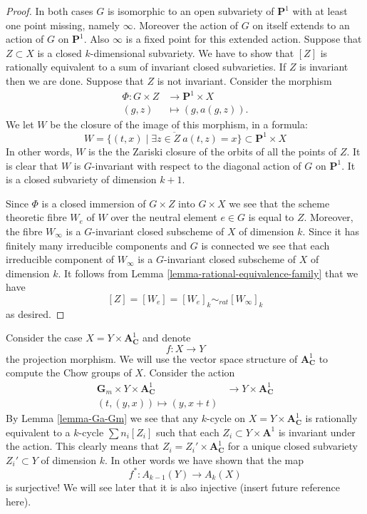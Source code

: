 \begin{proof}
In both cases $G$ is isomorphic to an open subvariety of $\mathbf{P}^1$
with at least one point missing, namely $\infty$. Moreover the
action of $G$ on itself extends to an action of $G$ on $\mathbf{P}^1$.
Also $\infty$ is a fixed point for this extended action.
Suppose that $Z \subset X$
is a closed $k$-dimensional subvariety. We have to show that $[Z]$
is rationally equivalent to a sum of invariant closed subvarieties.
If $Z$ is invariant then we are done. Suppose that $Z$ is not invariant.
Consider the morphism
\begin{align*}
\Phi : G \times Z & \longrightarrow \mathbf{P}^1 \times X \\
(g, z) & \longmapsto (g, a(g, z)).
\end{align*}
We let $W$ be the closure of the image of this morphism, in a
formula:
$$
W =
\overline{\{(t, x) \mid \exists z \in Z\ a(t, z) = x\}}
\subset \mathbf{P}^1 \times X
$$
In other words, $W$ is the
the Zariski closure of the orbits of all the points of $Z$.
It is clear that $W$ is $G$-invariant with respect to the diagonal
action of $G$ on $\mathbf{P}^1$. It is a closed subvariety of
dimension $k + 1$.

\medskip\noindent
Since $\Phi$ is a closed immersion of 
$G \times Z$ into $G \times X$ we see that the scheme theoretic
fibre $W_e$ of $W$ over the neutral element $e \in G$ is equal
to $Z$. Moreover, the fibre $W_\infty$ is a $G$-invariant closed
subscheme of $X$ of dimension $k$. Since it has finitely many
irreducible components and $G$ is connected we see that each
irreducible component of $W_\infty$ is a $G$-invariant closed
subscheme of $X$ of dimension $k$. It follows from
Lemma \ref{lemma-rational-equivalence-family}
that we have
$$
[Z] = [W_e] = [W_e]_k \sim_{rat} [W_\infty]_k
$$
as desired.
\end{proof}

\begin{example}
\label{example-affine-over-variety}
Consider the case $X = Y \times \mathbf{A}^1_{\mathbf{C}}$ and denote
$$
f : X \longrightarrow Y
$$
the projection morphism.
We will use the vector space structure of $\mathbf{A}^1_{\mathbf{C}}$
to compute the Chow groups of $X$. Consider the action
\begin{align*}
\mathbf{G}_m \times Y \times \mathbf{A}^1_{\mathbf{C}}
& \longrightarrow Y \times \mathbf{A}^1_{\mathbf{C}} \\
(t, (y, x)) \longmapsto (y, x + t)
\end{align*}
By Lemma \ref{lemma-Ga-Gm} we see that any $k$-cycle on
$X = Y \times \mathbf{A}^1_{\mathbf{C}}$
is rationally equivalent to a $k$-cycle $\sum n_i[Z_i]$ such that
each $Z_i \subset Y \times \mathbf{A}^1$ is invariant under the action.
This clearly means that $Z_i = Z_i' \times \mathbf{A}^1_{\mathbf{C}}$
for a unique closed subvariety $Z_i' \subset Y$
of dimension $k$. In other words we have shown that the map
$$
f^* : A_{k - 1}(Y) \longrightarrow A_k(X)
$$
is surjective! We will see later that it is also injective (insert
future reference here).
\end{example}

